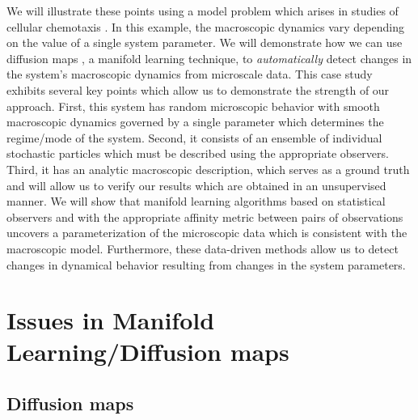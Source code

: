 \documentclass[preprint]{elsarticle}
\begin{document}
We will illustrate these points using a model problem which arises in studies of cellular chemotaxis \cite{othmer2000diffusion}.
%
In this example, the macroscopic dynamics vary depending on the value of a single system parameter.
%
We will demonstrate how we can use diffusion maps \cite{coifman2005geometric}, a manifold learning technique, to {\em automatically} detect changes in the system's macroscopic dynamics from microscale data.
%
This case study exhibits several key points which allow us to demonstrate the strength of our approach.
%
First, this system has random microscopic behavior with smooth macroscopic dynamics governed by a single parameter which determines the regime/mode of the system. 
%
Second, it consists of an ensemble of individual stochastic particles which must be described using the appropriate observers.
%
Third, it has an analytic macroscopic description, which serves as a ground truth and will allow us to verify our results which are obtained in an unsupervised manner.
%
We will show that manifold learning algorithms based on statistical observers and with the appropriate affinity metric between pairs of observations uncovers a parameterization of the microscopic data which is consistent with the macroscopic model.
%
Furthermore, these data-driven methods allow us to detect changes in dynamical behavior resulting from changes in the system parameters. 



\section{Issues in Manifold Learning/Diffusion maps}

\subsection{Diffusion maps}
\end{document}
